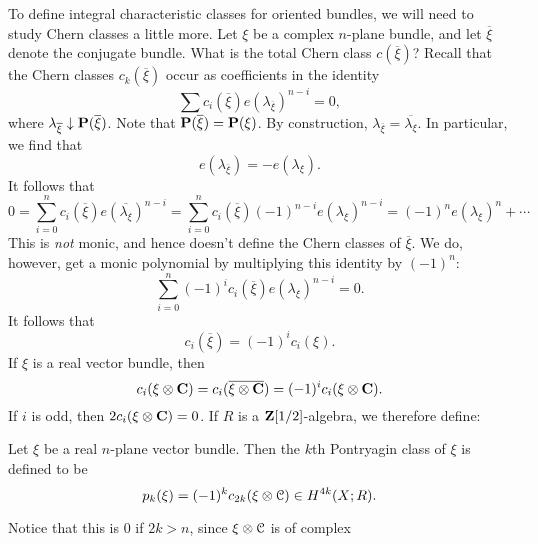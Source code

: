 To define integral characteristic classes for oriented bundles, we will need to
study Chern classes a little more.
%
%
%
Let $\xi$ be a complex $n$-plane bundle, and let $\overline{\xi}$ denote the
conjugate bundle. What is the total Chern class $c(\overline{\xi})$? Recall
that the Chern classes $c_k(\overline{\xi})$ occur as coefficients in the
identity
$$\sum c_i(\overline{\xi}) e(\lambda_{\overline{\xi}})^{n-i} = 0,$$
where $\lambda_{\overline{\xi}}\downarrow \mathbf P(\overline{\xi})$. Note that
$\mathbf P(\overline{\xi}) = \mathbf P(\xi)$. By construction, $\lambda_{\overline{\xi}} =
\overline{\lambda_\xi}$. In particular, we find that
$$e(\lambda_{\overline{\xi}}) = -e(\lambda_\xi).$$
It follows that
$$
0 = \sum^n_{i=0}c_i(\overline{\xi})e(\overline{\lambda_\xi})^{n-i} =
\sum^n_{i=0}c_i(\overline{\xi}) (-1)^{n-i}e(\lambda_\xi)^{n-i} = (-1)^n
e(\lambda_\xi)^n + \cdots
$$
This is \emph{not} monic, and hence doesn't define the Chern classes of
$\overline{\xi}$. We do, however, get a monic polynomial by multiplying this
identity by $(-1)^n$:
$$
\sum^n_{i=0}(-1)^ic_i(\overline{\xi})e(\lambda_\xi)^{n-i} = 0.
$$
It follows that
$$
\boxed{c_i(\overline{\xi}) = (-1)^ic_i(\xi).}
$$
If $\xi$ is a real vector bundle, then
$$c_i(\xi\otimes\mathbf C) = c_i(\overline{\xi\otimes\mathbf C}) =
(-1)^ic_i(\xi\otimes\mathbf C).$$
If $i$ is odd, then $2c_{i}(\xi\otimes\mathbf C) = 0$. If $R$ is a $\mathbf Z[1/2]$-algebra,
we therefore define:
\begin{definition}
    Let $\xi$ be a real $n$-plane vector bundle. Then the $k$th Pontryagin
    class of $\xi$ is defined to be 
    $$p_k(\xi) = (-1)^kc_{2k}(\xi\otimes\mathcal C)\in H^{4k}(X;R).$$
\end{definition}
Notice that this is $0$ if $2k>n$, since $\xi\otimes\mathcal C$ is of complex
